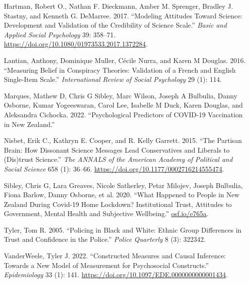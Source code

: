 \documentclass[
  singlecolumn]{report}
\newlength{\cslhangindent}
\newlength{\cslentryspacingunit} %
\newenvironment{CSLReferences}[2] %
 {%
  \setlength{\parindent}{0pt}
  \ifodd #1
  \let\oldpar\par
  \def\par{\hangindent=\cslhangindent\oldpar}
  \fi
  \setlength{\parskip}{#2\cslentryspacingunit}
 }%
 {}
\begin{document}
\hypertarget{refs}{}
\begin{CSLReferences}{1}{0}
\leavevmode{}%
Hartman, Robert O., Nathan F. Dieckmann, Amber M. Sprenger, Bradley J.
Stastny, and Kenneth G. DeMarree. 2017. {``Modeling Attitudes Toward
Science: Development and Validation of the Credibility of Science
Scale.''} \emph{Basic and Applied Social Psychology} 39: 358--71.
\url{https://doi.org/10.1080/01973533.2017.1372284}.

\leavevmode{}%
Lantian, Anthony, Dominique Muller, Cécile Nurra, and Karen M Douglas.
2016. {``Measuring Belief in Conspiracy Theories: Validation of a French
and English Single-Item Scale.''} \emph{International Review of Social
Psychology} 29 (1): 114.

\leavevmode{}%
Marques, Mathew D, Chris G Sibley, Marc Wilson, Joseph A Bulbulia, Danny
Osborne, Kumar Yogeeswaran, Carol Lee, Isabelle M Duck, Karen Douglas,
and Aleksandra Cichocka. 2022. {``Psychological Predictors of COVID-19
Vaccination in New Zealand.''}

\leavevmode{}%
Nisbet, Erik C., Kathryn E. Cooper, and R. Kelly Garrett. 2015. {``The
Partisan Brain: How Dissonant Science Messages Lead Conservatives and
Liberals to (Dis)trust Science.''} \emph{The ANNALS of the American
Academy of Political and Social Science} 658 (1): 36--66.
\url{https://doi.org/10.1177/0002716214555474}.

\leavevmode{}%
Sibley, Chris G, Lara Greaves, Nicole Satherley, Petar Milojev, Joseph
Bulbulia, Fiona Barlow, Danny Osborne, et al. 2020. {``What Happened to
People in New Zealand During Covid-19 Home Lockdown? Institutional
Trust, Attitudes to Government, Mental Health and Subjective
Wellbeing.''} \href{https://osf.io/e765a}{osf.io/e765a}.

\leavevmode{}%
Tyler, Tom R. 2005. {``Policing in Black and White: Ethnic Group
Differences in Trust and Confidence in the Police.''} \emph{Police
Quarterly} 8 (3): 322342.

\leavevmode{}%
VanderWeele, Tyler J. 2022. {``Constructed Measures and Causal
Inference: Towards a New Model of Measurement for Psychosocial
Constructs.''} \emph{Epidemiology} 33 (1): 141.
\url{https://doi.org/10.1097/EDE.0000000000001434}.

\end{CSLReferences}
\end{document}
